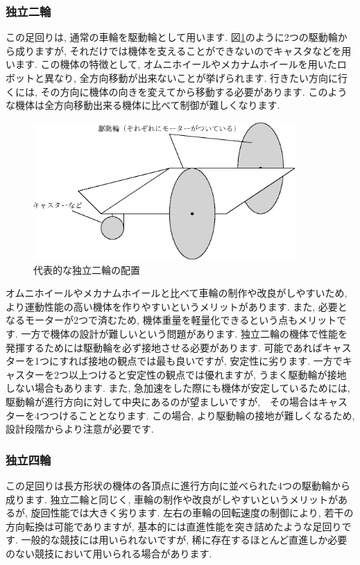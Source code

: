 \subsubsection{独立二輪}
この足回りは, 通常の車輪を駆動輪として用います. 
図\ref{fig:sadou2}のように2つの駆動輪から成りますが, それだけでは機体を支えることができないのでキャスタなどを用います. この機体の特徴として, オムニホイールやメカナムホイールを用いたロボットと異なり, 全方向移動が出来ないことが挙げられます. 行きたい方向に行くには, その方向に機体の向きを変えてから移動する必要があります. このような機体は全方向移動出来る機体に比べて制御が難しくなります. 

\begin{figure}[h]
  \centering
  \includegraphics[width=10cm]{mecha/fig/sadou2.eps}
  \caption{代表的な独立二輪の配置}
  \label{fig:sadou2}
\end{figure}

オムニホイールやメカナムホイールと比べて車輪の制作や改良がしやすいため, より運動性能の高い機体を作りやすいというメリットがあります. また, 必要となるモーターが2つで済むため, 機体重量を軽量化できるという点もメリットです. 一方で機体の設計が難しいという問題があります. 独立二輪の機体で性能を発揮するためには駆動輪を必ず接地させる必要があります. 可能であればキャスターを1つにすれば接地の観点では最も良いですが, 安定性に劣ります. 一方でキャスターを2つ以上つけると安定性の観点では優れますが, うまく駆動輪が接地しない場合もあります. 
また, 急加速をした際にも機体が安定しているためには, 駆動輪が進行方向に対して中央にあるのが望ましいですが,　その場合はキャスターを4つつけることとなります. この場合, より駆動輪の接地が難しくなるため, 設計段階からより注意が必要です. 

\subsubsection{独立四輪}
この足回りは長方形状の機体の各頂点に進行方向に並べられた4つの駆動輪から成ります. 
独立二輪と同じく, 車輪の制作や改良がしやすいというメリットがあるが, 旋回性能では大きく劣ります. 左右の車輪の回転速度の制御により, 若干の方向転換は可能でありますが, 基本的には直進性能を突き詰めたような足回りです. 一般的な競技には用いられないですが, 稀に存在するほとんど直進しか必要のない競技において用いられる場合があります. 

